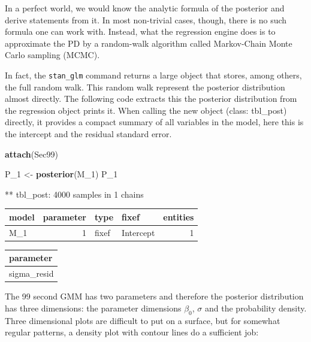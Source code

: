 \documentclass[]{svmono}
\newenvironment{Shaded}{\begin{snugshade}}{\end{snugshade}}
\newcommand{\KeywordTok}[1]{\textcolor[rgb]{0.13,0.29,0.53}{\textbf{#1}}}
\newcommand{\DecValTok}[1]{\textcolor[rgb]{0.00,0.00,0.81}{#1}}
\newcommand{\StringTok}[1]{\textcolor[rgb]{0.31,0.60,0.02}{#1}}
\newcommand{\NormalTok}[1]{#1}
\theoremstyle{definition}
\theoremstyle{definition}
\theoremstyle{definition}
\theoremstyle{remark}
\begin{document}
In a perfect world, we would know the analytic formula of the posterior
and derive statements from it. In most non-trivial cases, though, there
is no such formula one can work with. Instead, what the regression
engine does is to approximate the PD by a random-walk algorithm called
Markov-Chain Monte Carlo sampling (MCMC).

In fact, the \texttt{stan\_glm} command returns a large object that
stores, among others, the full random walk. This random walk represent
the posterior distribution almost directly. The following code extracts
this the posterior distribution from the regression object prints it.
When calling the new object (class: tbl\_post) directly, it provides a
compact summary of all variables in the model, here this is the
intercept and the residual standard error.

\begin{Shaded}
\begin{Highlighting}[]
\KeywordTok{attach}\NormalTok{(Sec99)}
\end{Highlighting}
\end{Shaded}

\begin{Shaded}
\begin{Highlighting}[]
\NormalTok{P_}\DecValTok{1}\NormalTok{ <-}\StringTok{  }\KeywordTok{posterior}\NormalTok{(M_}\DecValTok{1}\NormalTok{)}
\NormalTok{P_}\DecValTok{1}
\end{Highlighting}
\end{Shaded}

** tbl\_post: 4000 samples in 1 chains

\begin{longtable}[]{@{}lrllr@{}}
\toprule
model & parameter & type & fixef & entities\tabularnewline
\midrule
\endhead
M\_1 & 1 & fixef & Intercept & 1\tabularnewline
\bottomrule
\end{longtable}

\begin{longtable}[]{@{}l@{}}
\toprule
parameter\tabularnewline
\midrule
\endhead
sigma\_resid\tabularnewline
\bottomrule
\end{longtable}

The 99 second GMM has two parameters and therefore the posterior
distribution has three dimensions: the parameter dimensions \(\beta_0\),
\(\sigma\) and the probability density. Three dimensional plots are
difficult to put on a surface, but for somewhat regular patterns, a
density plot with contour lines do a sufficient job:
\end{document}
